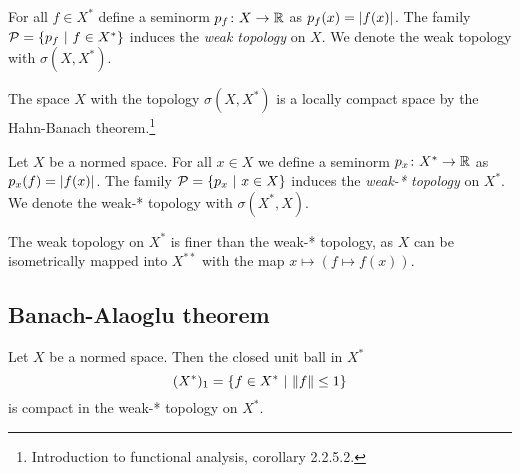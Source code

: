 \begin{definicija}
For all $f \in X^*$ define a seminorm $p_f \colon X \to \mathbb{R}$ as
$p_f(x) = \left\lvert f(x)\right\rvert$. The family
$\mathcal{P} = \left\{p_f~\middle\vert~f \in X^*\right\}$ induces the
\emph{weak topology} on $X$. We denote the
weak topology with $\sigma(X, X^*)$.
\end{definicija}

\begin{opomba}
The space $X$ with the topology $\sigma(X, X^*)$ is a locally
compact space by the Hahn-Banach theorem.\footnote{Introduction to
functional analysis, corollary 2.2.5.2.}
\end{opomba}

\begin{definicija}
Let $X$ be a normed space. For all $x \in X$ we define a seminorm
$p_x \colon X^* \to \mathbb{R}$ as $p_x(f) = \left\lvert f(x)\right\rvert$. The family
$\mathcal{P} = \left\{p_x~\middle\vert~x \in X\right\}$ induces the
\emph{weak-* topology} on $X^*$. We denote
the weak-* topology with $\sigma(X^*, X)$.
\end{definicija}

\begin{opomba}
The weak topology on $X^*$ is finer than the weak-* topology, as
$X$ can be isometrically mapped into $X^{**}$ with the map
$x \mapsto (f \mapsto f(x))$.
\end{opomba}

\newpage

\subsection{Banach-Alaoglu theorem}

\begin{izrek}
Let $X$ be a normed space. Then the closed unit ball in $X^*$
\[
(X^*)_1 = \left\{f \in X^*~\middle\vert~\left\lVert f\right\rVert \leq 1\right\}
\]
is compact in the weak-* topology on $X^*$.
\end{izrek}


